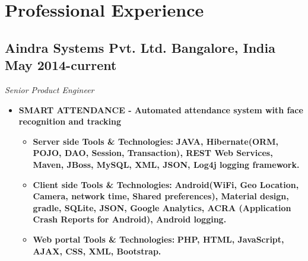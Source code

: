 \documentclass[11pt,letterpaper,sans]{moderncv}        %
\begin{document}
\section{Professional Experience}

\vspace{2pt}

\subsection{\textbf{Aindra Systems Pvt. Ltd.} Bangalore, India \small{May 2014-current}}
\textit{Senior Product Engineer}

\begin{small}

\vspace{5pt}

\begin{itemize}

\item \textbf{SMART ATTENDANCE - Automated attendance system with face recognition and tracking}
\vspace{2pt}
\begin{itemize}
\item \textbf{Server side Tools \& Technologies:} \textbf{JAVA, Hibernate(ORM, POJO, DAO, Session, Transaction), REST Web Services, Maven, JBoss, MySQL, XML, JSON, Log4j logging framework.}
\vspace{2pt}
\item \textbf{Client side Tools \& Technologies:} \textbf{Android(WiFi, Geo Location, Camera, network time, Shared preferences), Material design, gradle, SQLite, JSON, Google Analytics, ACRA (Application Crash Reports for Android), Android logging.}
\vspace{2pt}
\item \textbf{Web portal Tools \& Technologies:} \textbf{PHP, HTML, JavaScript, AJAX, CSS, XML, Bootstrap.}

\vspace{3pt}


\end{itemize}
\end{itemize}
\end{small}
\end{document}
